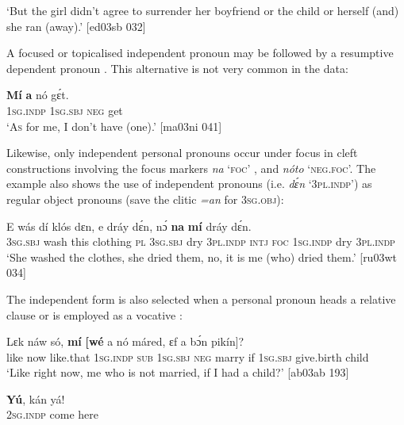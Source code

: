 \glt ‘But the girl didn’t agree to surrender her boyfriend or the child or herself (and) she ran (away).’ [ed03sb 032]
\z

A focused or topicalised independent pronoun may be followed by a resumptive dependent pronoun . This alternative is not very common in the data:

\ea%
    \label{ex:key:280}
    \gll \textbf{Mí}    \textbf{a}    nó  gɛ́t.\\
\textsc{1sg.indp}  \textsc{1sg.sbj}  \textsc{neg}  get\\

\glt ‘\textsc{As} for me, I don’t have (one).’ [ma03ni 041]
\z

Likewise, only independent personal pronouns occur under focus in cleft constructions {\fff}involving the focus markers \textit{na} ‘\textsc{foc}’ , and \textit{nóto} ‘\textsc{neg.foc}’. The example also shows the use of independent pronouns (i.e. \textit{dɛ́n} ‘\textsc{3pl.indp}’) as regular object pronouns (save the clitic \textit{=an} for \textsc{3sg.obj}):


\ea%
\label{ex:key:281}
\gll E    wás    dí  klós    dɛn,    e    dráy    dɛ́n, nɔ́  \textbf{na}  \textbf{mí}    dráy    dɛ́n.\\
\textsc{3sg.sbj}  wash  this  clothing  \textsc{pl}    \textsc{3sg.sbj}  dry    \textsc{3pl.indp} \textsc{intj}  \textsc{foc}  \textsc{1sg.indp}  dry    \textsc{3pl.indp}\\

\glt ‘She washed the clothes, she dried them, no, it is me (who) dried them.’
[ru03wt 034]
\z

The independent form is also selected when a personal pronoun heads a relative clause  or is employed as a vocative :


\ea%
    \label{ex:key:282}
    \gll Lɛk  náw    só,    \textbf{mí} \textbf{\textmd{[}}\textbf{wé} a    nó  máred,
ɛf  a    bɔ́n      pikín]?\\
like  now    like.that  \textsc{1sg.indp}  \textsc{sub}  \textsc{1sg.sbj}  \textsc{neg}  marry
if  \textsc{1sg.sbj}  give.birth  child \\

\glt ‘Like right now, me who is not married, if I had a child?’ [ab03ab 193]
\z


\ea%
    \label{ex:key:283}
    \gll \textbf{Yú},    kán    yá!\\
\textsc{2sg.indp}  come  here\\

